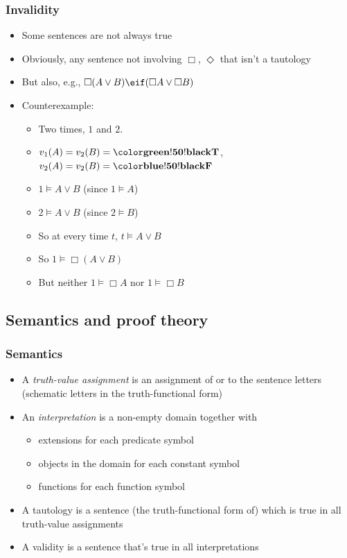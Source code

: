 \begin{frame}
  \frametitle{Invalidity}

\begin{itemize}[<+->]
  \item Some sentences are not always true
  \item Obviously, any sentence not involving $\Box$, $\Diamond$ that
  isn't a tautology
  \item But also, e.g., $\Box(A \lor B) \eif (\Box A \lor \Box B)$
  \item Counterexample:
  \begin{itemize}
    \item Two times, $1$ and $2$.
    \item $v_1(A) = v_2(B) = \True$, $v_2(A) = v_2(B) = \False$
    \item $1 \models A \lor B$ (since $1 \models A$)
    \item $2 \models A \lor B$ (since $2 \models B$)
    \item So at every time $t$, $t \models A \lor B$
    \item So $1 \models \Box(A \lor B)$
    \item But neither $1 \models \Box A$ nor $1 \models \Box B$
  \end{itemize}
\end{itemize}
\end{frame}



\newhourlecture

\subsection{Semantics and proof theory}

\begin{frame}
    \frametitle{Semantics}

\begin{itemize}
\item A \emph{truth-value assignment} is an assignment of \True{} or \False{} to the sentence letters (schematic letters in the truth-functional form)
\item An \emph{interpretation} is a non-empty domain together with
\begin{itemize}
\item extensions for each predicate symbol
\item objects in the domain for each constant symbol
\item functions for each function symbol
\end{itemize}
\item A tautology is a sentence (the truth-functional form of) which is true in all truth-value assignments
\item A validity is a sentence that's true in all interpretations
\end{itemize}
\end{frame}


